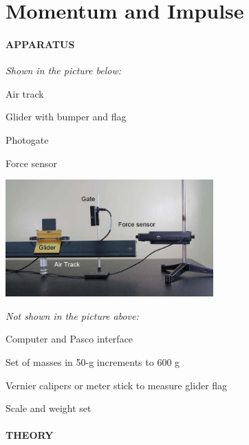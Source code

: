 
\vspace{-5ex}\part*{Momentum and Impulse}

\subsection*{APPARATUS}

\noindent\textit{Shown in the picture below:}
\squishlist
\item Air track
\item Glider with bumper and flag
\item Photogate
\item Force sensor
\squishend
\begin{center} \includegraphics*[width=0.6\textwidth]{imgs/6labs/6Alab/6Aexp5/glider_tack_main_white_text.jpg} \end{center}
\noindent\textit{Not shown in the picture above:}
\squishlist
\item Computer and Pasco interface
\item Set of masses in 50-g increments to 600 g
\item Vernier calipers or meter stick to measure glider flag
\item Scale and weight set
\squishend

\subsection*{THEORY}

